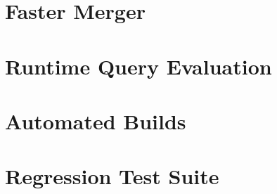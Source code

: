 \section{Faster Merger}\label{sec:faster-merger}

\section{Runtime Query Evaluation}\label{sec:runtime-query}

\section{Automated Builds}\label{sec:automated-builds}

\section{Regression Test Suite}\label{sec:regression-suite}

